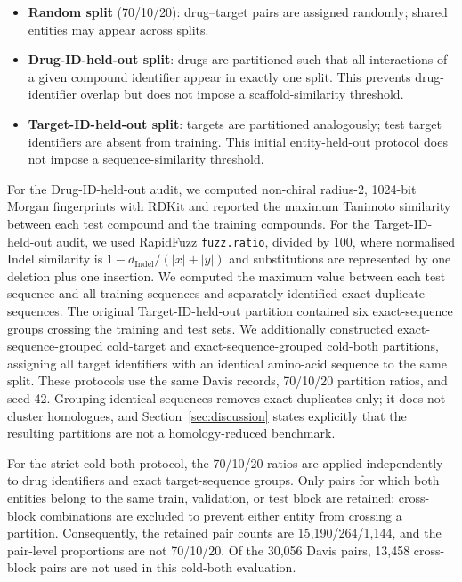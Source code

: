 \documentclass[fleqn,10pt]{wlscirep}
\begin{document}
\begin{itemize}[leftmargin=*]
\item \textbf{Random split} (70/10/20): drug--target pairs are assigned randomly;
  shared entities may appear across splits.
\item \textbf{Drug-ID-held-out split}: drugs are partitioned such that all interactions
  of a given compound identifier appear in exactly one split.  This prevents
  drug-identifier overlap but does not impose a scaffold-similarity threshold.
\item \textbf{Target-ID-held-out split}: targets are partitioned analogously; test
  target identifiers are absent from training.  This initial entity-held-out
  protocol does not impose a sequence-similarity threshold.
\end{itemize}

For the Drug-ID-held-out audit, we computed non-chiral radius-2, 1024-bit Morgan
fingerprints with RDKit and
reported the maximum Tanimoto similarity between each test compound and the
training compounds. For the Target-ID-held-out audit, we used RapidFuzz
\texttt{fuzz.ratio}, divided by 100, where normalised Indel similarity is
$1-d_\mathrm{Indel}/(|x|+|y|)$ and substitutions are represented by one
deletion plus one insertion. We computed the maximum value between each test
sequence and all training sequences and separately identified exact duplicate
sequences. The original
Target-ID-held-out partition contained six exact-sequence groups crossing the
training and test sets. We additionally constructed exact-sequence-grouped cold-target
and exact-sequence-grouped cold-both partitions, assigning all target identifiers with an identical
amino-acid sequence to the same split.
These protocols use the same Davis records, 70/10/20 partition ratios, and
seed 42.  Grouping identical sequences removes exact duplicates only; it does
not cluster homologues, and Section~\ref{sec:discussion} states explicitly that
the resulting partitions are not a homology-reduced benchmark.

For the strict cold-both protocol, the 70/10/20 ratios are applied independently
to drug identifiers and exact target-sequence groups. Only pairs for which both
entities belong to the same train, validation, or test block are retained;
cross-block combinations are excluded to prevent either entity from crossing a
partition. Consequently, the retained pair counts are 15{,}190/264/1{,}144,
and the pair-level proportions are not 70/10/20. Of the 30{,}056 Davis pairs,
13{,}458 cross-block pairs are not used in this cold-both evaluation.
\end{document}
